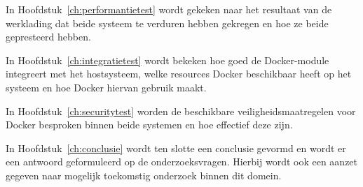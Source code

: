 In Hoofdstuk~\ref{ch:performantietest} wordt gekeken naar het resultaat van de werklading dat beide systeem te verduren hebben gekregen en hoe ze beide gepresteerd hebben.

In Hoofdstuk~\ref{ch:integratietest} wordt bekeken hoe goed de Docker-module integreert met het hostsysteem, welke resources Docker beschikbaar heeft op het systeem en hoe Docker hiervan gebruik maakt.

In Hoofdstuk~\ref{ch:securitytest} worden de beschikbare veiligheidsmaatregelen voor Docker besproken binnen beide systemen en hoe effectief deze zijn.

In  Hoofdstuk~\ref{ch:conclusie} wordt ten slotte een conclusie gevormd en wordt er een antwoord geformuleerd op de onderzoeksvragen. Hierbij wordt ook een aanzet gegeven naar mogelijk toekomstig onderzoek binnen dit domein.

